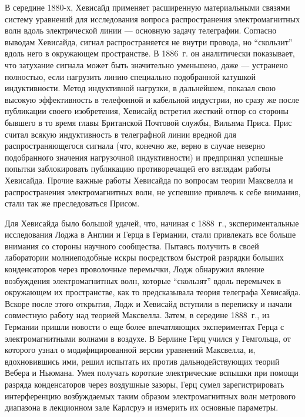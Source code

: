 \documentclass[12pt, oneside, a4paper]{article}
\begin{document}
В середине 1880-х, Хевисайд применяет расширенную материальными связями систему уравнений для исследования вопроса распространения электромагнитных волн вдоль электрической линии --- основную задачу телеграфии. Согласно выводам Хевисайда, сигнал распространяется не внутри провода, но ``скользит'' вдоль него в окружающем пространстве. В 1886~г. он аналитически показывает, что затухание сигнала может быть значительно уменьшено, даже --- устранено полностью, если нагрузить линию специально подобранной катушкой индуктивности. Метод индуктивной нагрузки, в дальнейшем, показал свою высокую эффективность в телефонной и кабельной индустрии, но сразу же после публикации своего изобретения, Хевисайд встретил жесткий отпор со стороны бывшего в то время главы Британской Почтовой службы, Вильяма Приса. Прис считал всякую индуктивность в телеграфной линии вредной для распространяющегося сигнала (что, конечно же, верно в случае неверно подобранного значения нагрузочной индуктивности) и предпринял успешные попытки заблокировать публикацию противоречащей его взглядам работы Хевисайда. Прочие важные работы Хевисайда по вопросам теории Максвелла и распространения электромагнитных волн, не успевшие привлечь к себе внимания, стали так же преследоваться Присом.

Для Хевисайда было большой удачей, что, начиная с 1888~г., экспериментальные исследования Лоджа в Англии и Герца в Германии, стали привлекать все больше внимания со стороны научного сообщества. Пытаясь получить в своей лаборатории молниеподобные искры посредством быстрой разрядки больших конденсаторов через проволочные перемычки, Лодж обнаружил явление возбуждения электромагнитных волн, которые ``скользят'' вдоль перемычек в окружающем их пространстве, как то предсказывала теория телеграфа Хевисайда. Вскоре после этого открытия, Лодж и Хевисайд вступили в переписку и начали совместную работу над теорией Максвелла. Затем, в середине 1888~г., из Германии пришли новости о еще более впечатляющих экспериментах Герца с электромагнитными волнами в воздухе.  В Берлине Герц учился у Гемгольца, от которого узнал о модифицированной версии уравнений Максвелла, и, вдохновившись ими, решил испытать их против дальнодействующих теорий Вебера и Ньюмана. Умея получать короткие электрические вспышки при помощи разряда конденсаторов через воздушные зазоры, Герц сумел зарегистрировать интерференцию возбуждаемых таким образом электромагнитных волн метрового диапазона в  лекционном зале Карлсруэ и измерить их основные параметры.
\end{document}
